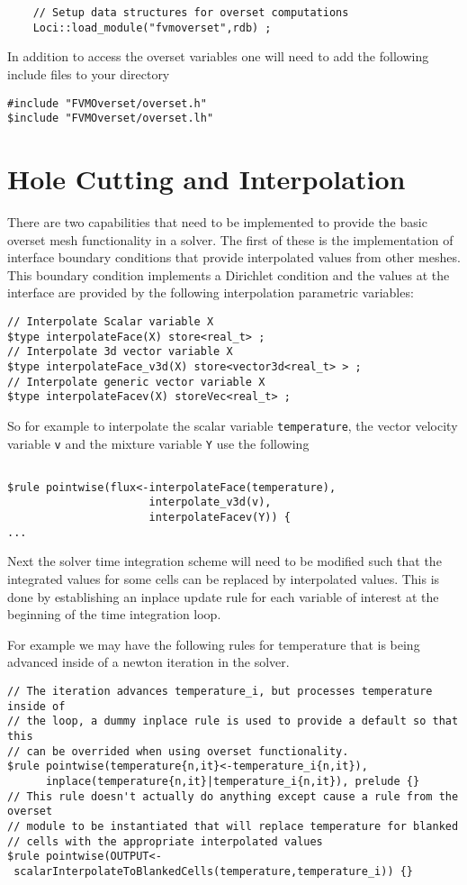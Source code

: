 \documentclass{article}
\begin{document}
\begin{verbatim}
    // Setup data structures for overset computations
    Loci::load_module("fvmoverset",rdb) ;
\end{verbatim}

In addition to access the overset variables one will need to add the following include files to your directory
\begin{verbatim}
#include "FVMOverset/overset.h"
$include "FVMOverset/overset.lh"
\end{verbatim}

\section{Hole Cutting and Interpolation}


There are two capabilities that need to be implemented to provide the basic overset mesh functionality in a solver.  The first of these is the implementation of interface boundary conditions that provide interpolated values from other meshes.  This boundary condition implements a Dirichlet condition and the values at the interface are provided by the following interpolation parametric variables:
\begin{verbatim}
// Interpolate Scalar variable X
$type interpolateFace(X) store<real_t> ;
// Interpolate 3d vector variable X
$type interpolateFace_v3d(X) store<vector3d<real_t> > ;
// Interpolate generic vector variable X
$type interpolateFacev(X) storeVec<real_t> ;
\end{verbatim}

So for example to interpolate the scalar variable {\tt temperature}, the vector velocity variable {\tt v} and the mixture variable {\tt Y} use the following
\begin{verbatim}

$rule pointwise(flux<-interpolateFace(temperature),
                      interpolate_v3d(v),
                      interpolateFacev(Y)) { 
...
\end{verbatim}

Next the solver time integration scheme will need to be modified such that the integrated values for some cells can be replaced by interpolated values.  This is done by establishing an inplace update rule for each variable of interest at the beginning of the time integration loop.

For example we may have the following rules for temperature that is being advanced inside of a newton iteration in the solver.
\begin{verbatim}
// The iteration advances temperature_i, but processes temperature inside of
// the loop, a dummy inplace rule is used to provide a default so that this
// can be overrided when using overset functionality.
$rule pointwise(temperature{n,it}<-temperature_i{n,it}),
      inplace(temperature{n,it}|temperature_i{n,it}), prelude {}
// This rule doesn't actually do anything except cause a rule from the overset
// module to be instantiated that will replace temperature for blanked
// cells with the appropriate interpolated values
$rule pointwise(OUTPUT<-
 scalarInterpolateToBlankedCells(temperature,temperature_i)) {}
\end{verbatim}
\end{document}
